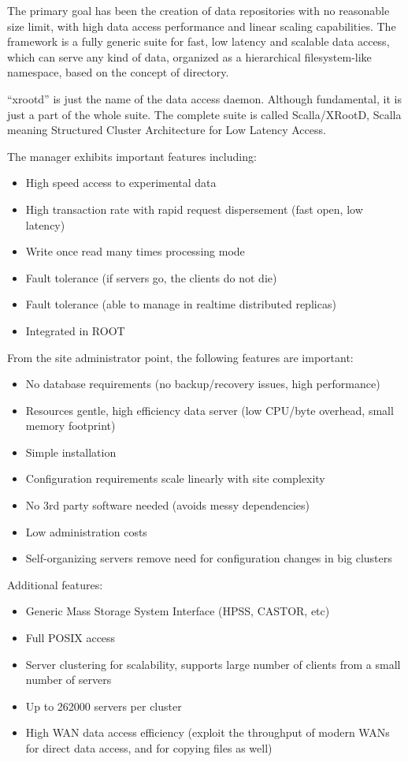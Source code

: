 The primary goal has been the creation of data repositories with no
reasonable size limit, with high data access performance and linear
scaling capabilities. The framework is a fully generic suite for
fast, low latency and scalable data access, which can serve any kind
of data, organized as a hierarchical filesystem-like namespace,
based on the concept of directory.

``xrootd'' is just the name of the data access daemon. Although
fundamental, it is just a part of the whole suite. The complete
suite is called Scalla/XRootD, Scalla meaning Structured Cluster
Architecture for Low Latency Access.

The manager exhibits important features including:
%
\begin{itemize}
\item High speed access to experimental data
\item High transaction rate with rapid request dispersement (fast
open, low latency)
\item Write once read many times processing mode
\item Fault tolerance (if servers go, the clients do not die)
\item Fault tolerance (able to manage in realtime distributed
replicas)
\item Integrated in ROOT
\end{itemize}

From the site administrator point, the following features are
important:
\begin{itemize}
\item  No database requirements (no backup/recovery issues, high
performance)
\item Resources gentle, high efficiency data server (low
CPU/byte overhead, small memory footprint)
\item  Simple installation
\item Configuration requirements scale linearly with site complexity
\item No 3rd party software needed (avoids messy dependencies)
\item Low administration costs
\item Self-organizing servers remove need for
configuration changes in big clusters
\end{itemize}

Additional features:
\begin{itemize}
\item Generic Mass Storage System Interface (HPSS, CASTOR, etc)
\item Full POSIX access
\item Server clustering for scalability, supports large number of
clients from a small number of servers
\item Up to 262000 servers per cluster
\item High WAN data access efficiency (exploit the throughput of
modern WANs for direct data access, and for copying files as well)
\end{itemize}

